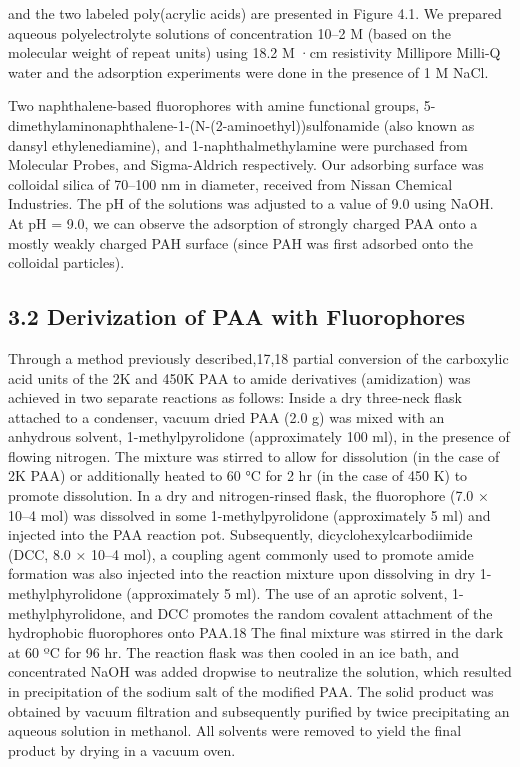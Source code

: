 \documentclass[journal=jacsat,manuscript=article]{achemso}
\begin{document}
and the two labeled poly(acrylic acids) are presented in Figure 4.1.  We prepared aqueous polyelectrolyte solutions of concentration 10–2 M (based on the molecular weight of repeat units) using 18.2 M·cm resistivity Millipore Milli-Q water and the adsorption experiments were done in the presence of 1 M NaCl.  

Two naphthalene-based fluorophores with amine functional groups, 5-dimethylaminonaphthalene-1-(N-(2-aminoethyl))sulfonamide (also known as dansyl ethylenediamine), and 1-naphthalmethylamine were purchased from Molecular Probes, and Sigma-Aldrich respectively.  Our adsorbing surface was colloidal silica of 70–100 nm in diameter, received from Nissan Chemical Industries. The pH of the solutions was adjusted to a value of 9.0 using NaOH.  At pH = 9.0, we can observe the adsorption of strongly charged PAA onto a mostly weakly charged PAH surface (since PAH was first adsorbed onto the colloidal particles).

\subsection{3.2 Derivization of PAA with Fluorophores}

Through a method previously described,17,18 partial conversion of the carboxylic acid units of the 2K and 450K PAA to amide derivatives (amidization) was achieved in two separate reactions as follows:  Inside a dry three-neck flask attached to a condenser, vacuum dried PAA (2.0 g) was mixed with an anhydrous solvent, 1-methylpyrolidone (approximately 100 ml), in the presence of flowing nitrogen.  The mixture was stirred to allow for dissolution (in the case of 2K PAA) or additionally heated to 60 °C for 2 hr (in the case of 450 K) to promote dissolution.  In a dry and nitrogen-rinsed flask, the fluorophore (7.0 × 10–4 mol) was dissolved in some 1-methylpyrolidone (approximately 5 ml) and injected into the PAA reaction pot.  Subsequently, dicyclohexylcarbodiimide (DCC, 8.0 × 10–4 mol), a coupling agent commonly used to promote amide formation was also injected into the reaction mixture upon dissolving in dry 1-methylphyrolidone (approximately 5 ml).  The use of an aprotic solvent, 1-methylphyrolidone, and DCC promotes the random covalent attachment of the hydrophobic fluorophores onto PAA.18  The final mixture was stirred in the dark at 60 ºC for 96 hr.  The reaction flask was then cooled in an ice bath, and concentrated NaOH was added dropwise to neutralize the solution, which resulted in precipitation of the sodium salt of the modified PAA.  The solid product was obtained by vacuum filtration and subsequently purified by twice precipitating an aqueous solution in methanol.  All solvents were removed to yield the final product by drying in a vacuum oven.
\end{document}
